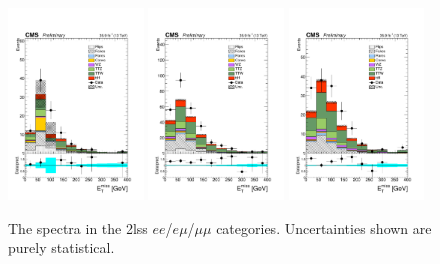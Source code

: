\begin{figure}[htp]
\centering
\includegraphics[width=0.32\textwidth]{ch5_figs/met_ttH_ee_stackPlot_SR.pdf}
\includegraphics[width=0.32\textwidth]{ch5_figs/met_ttH_em_stackPlot_SR.pdf}
\includegraphics[width=0.32\textwidth]{ch5_figs/met_ttH_mm_stackPlot_SR.pdf} \\
\caption[Data/MC comparison of the \met in the signal region]{The \met spectra in the 2lss $ee$/$e\mu$/$\mu\mu$ categories. Uncertainties shown are purely statistical.}
\label{fig:sr_met}
\end{figure}

